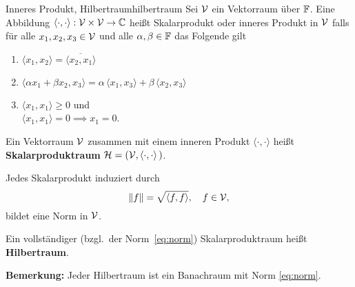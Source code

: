 \begin{boringDef}{Inneres Produkt, Hilbertraum}{hilbertraum}
  Sei $\mathcal{V}$ ein Vektorraum über $\mathbb{F}$.
  Eine Abbildung $\langle\cdot, \cdot\rangle : \mathcal{V}\times\mathcal{V} \to \mathbb{C}$ heißt Skalarprodukt oder inneres Produkt in $\mathcal{V}$ falls für alle $x_{1},x_{2},x_{3} \in \mathcal{V}$ und alle $\alpha,\beta \in \mathbb{F}$ das Folgende gilt
  \begin{enumerate}
          \item $\langle x_{1}, x_{2}\rangle = \overline{\langle x_{2}, x_{1}\rangle}$
          \item $\langle \alpha x_{1} + \beta x_{2}, x_{3} \rangle = \alpha\,\langle x_{1}, x_{3}\rangle + \beta \, \langle x_{2}, x_{3} \rangle$
          \item $\langle x_{1}, x_{1} \rangle \geq 0$ und\\ $\langle x_{1}, x_{1} \rangle = 0 \implies x_{1} = 0$.
  \end{enumerate}
  Ein Vektorraum $\mathcal{V}$ zusammen mit einem inneren Produkt $\langle \cdot, \cdot \rangle$ heißt \textbf{Skalarproduktraum} $\mathcal{H} = (\mathcal{V}, \langle \cdot, \cdot \rangle \,)$.

  Jedes Skalarprodukt induziert durch
  \begin{equation}
    \|f\| = \sqrt{\langle f, f \rangle}, \quad f \in \mathcal{V},\label{eq:norm}
  \end{equation}
  bildet eine Norm in $\mathcal{V}$.

  Ein vollständiger (bzgl.\ der Norm~\eqref{eq:norm}) Skalarproduktraum heißt \textbf{Hilbertraum}.
\end{boringDef}

\textbf{Bemerkung:} Jeder Hilbertraum ist ein Banachraum mit Norm \eqref{eq:norm}.
